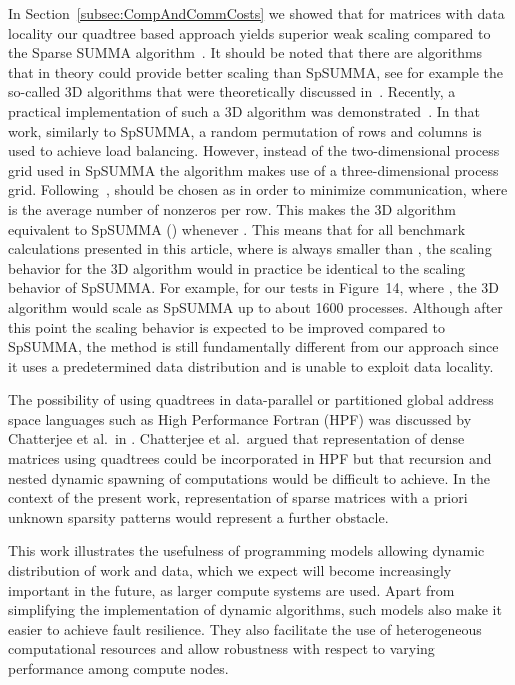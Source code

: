 \documentclass{elsarticle}
\begin{document}
In Section~\ref{subsec:CompAndCommCosts} we showed that for matrices
with data locality our quadtree based approach yields superior weak
scaling compared to the Sparse SUMMA
algorithm~\cite{SparseSUMMA2008}. It should be noted that there are
algorithms that in theory could provide better scaling than SpSUMMA,
see for example the so-called 3D algorithms that were theoretically
discussed in~\cite{communication_optimal_2}.  Recently, a practical
implementation of such a 3D algorithm was
demonstrated~\cite{Azad2015}.  In that work, similarly to SpSUMMA, a
random permutation of rows and columns is used to achieve load
balancing.  However, instead of the two-dimensional  process grid used in SpSUMMA the algorithm makes use of a
three-dimensional  process grid.
Following~\cite{communication_optimal_2},  should be chosen as
 in order to minimize communication, where 
is the average number of nonzeros per row. This makes the 3D algorithm
equivalent to SpSUMMA () whenever .  This means
that for all benchmark calculations presented in this article, where
 is always smaller than , the scaling behavior for the 3D
algorithm would in practice be identical to the scaling behavior of
SpSUMMA. For example, for our tests in Figure~14, where , the
3D algorithm would scale as SpSUMMA up to about 1600 processes.
Although after this point the scaling behavior is expected to be
improved compared to SpSUMMA, the method is still fundamentally
different from our approach since it uses a predetermined data
distribution and is unable to exploit data locality.

The possibility of using quadtrees in data-parallel or partitioned
global address space languages such as High Performance Fortran (HPF)
was discussed by Chatterjee et al.~in
\cite{ChatterjeeMatMul2002_A}. Chatterjee et al.~argued that
representation of dense matrices using quadtrees could be incorporated
in HPF but that recursion and nested dynamic spawning of computations
would be difficult to achieve. In the context of the present work,
representation of sparse matrices with a priori unknown sparsity
patterns would represent a further obstacle.

This work illustrates the usefulness of programming models allowing dynamic distribution of
work and data, which we expect will become increasingly important in the future, as
larger compute systems are used.
Apart from simplifying the implementation of dynamic algorithms, 
such models also make it easier to achieve
fault resilience. They also facilitate the use of heterogeneous
computational resources and allow robustness with respect to varying
performance among compute nodes.
\end{document}
